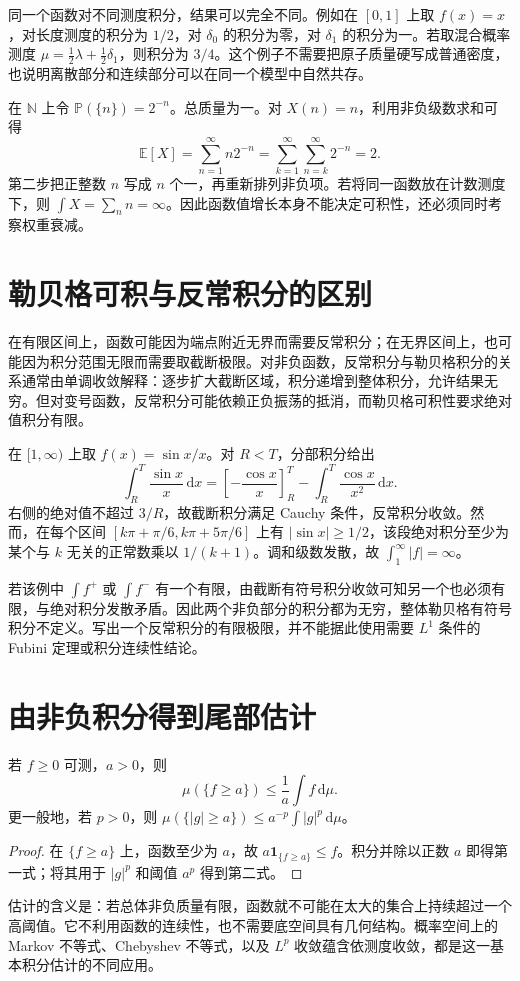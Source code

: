 \documentclass[UTF8,12pt,a4paper,fontset=fandol]{ctexbook}
\begin{document}
同一个函数对不同测度积分，结果可以完全不同。例如在 $[0,1]$ 上取 $f(x)=x$，对长度测度的积分为 $1/2$，对 $\delta_0$ 的积分为零，对 $\delta_1$ 的积分为一。若取混合概率测度 $\mu=\tfrac12\lambda+\tfrac12\delta_1$，则积分为 $3/4$。这个例子不需要把原子质量硬写成普通密度，也说明离散部分和连续部分可以在同一个模型中自然共存。

\begin{example}[具有不同权重的可数模型]
在 $\mathbb N$ 上令 $\mathbb P(\{n\})=2^{-n}$。总质量为一。对 $X(n)=n$，利用非负级数求和可得
\[
 \mathbb E[X]=\sum_{n=1}^{\infty}n2^{-n}
 =\sum_{k=1}^{\infty}\sum_{n=k}^{\infty}2^{-n}=2.
\]
第二步把正整数 $n$ 写成 $n$ 个一，再重新排列非负项。若将同一函数放在计数测度下，则 $\int X=\sum_nn=\infty$。因此函数值增长本身不能决定可积性，还必须同时考察权重衰减。
\end{example}

\section{勒贝格可积与反常积分的区别}
在有限区间上，函数可能因为端点附近无界而需要反常积分；在无界区间上，也可能因为积分范围无限而需要取截断极限。对非负函数，反常积分与勒贝格积分的关系通常由单调收敛解释：逐步扩大截断区域，积分递增到整体积分，允许结果无穷。但对变号函数，反常积分可能依赖正负振荡的抵消，而勒贝格可积性要求绝对值积分有限。

\begin{example}[条件收敛的反常积分不等于勒贝格可积]
在 $[1,\infty)$ 上取 $f(x)=\sin x/x$。对 $R<T$，分部积分给出
\[
 \int_R^T\frac{\sin x}{x}\,\mathrm dx
 =\left[-\frac{\cos x}{x}\right]_R^T-\int_R^T\frac{\cos x}{x^2}\,\mathrm dx.
\]
右侧的绝对值不超过 $3/R$，故截断积分满足 Cauchy 条件，反常积分收敛。然而，在每个区间
$[k\pi+\pi/6,k\pi+5\pi/6]$ 上有 $|\sin x|\geq1/2$，该段绝对积分至少为某个与 $k$ 无关的正常数乘以 $1/(k+1)$。调和级数发散，故 $\int_1^\infty|f|=\infty$。
\end{example}

若该例中 $\int f^+$ 或 $\int f^-$ 有一个有限，由截断有符号积分收敛可知另一个也必须有限，与绝对积分发散矛盾。因此两个非负部分的积分都为无穷，整体勒贝格有符号积分不定义。写出一个反常积分的有限极限，并不能据此使用需要 $L^1$ 条件的 Fubini 定理或积分连续性结论。

\section{由非负积分得到尾部估计}
\begin{proposition}
若 $f\geq0$ 可测，$a>0$，则
\[
 \mu(\{f\geq a\})\leq\frac1a\int f\,\mathrm d\mu.
\]
更一般地，若 $p>0$，则
$\mu(\{|g|\geq a\})\leq a^{-p}\int|g|^p\,\mathrm d\mu$。
\label{prop:mt-markov}
\end{proposition}
\begin{proof}
在 $\{f\geq a\}$ 上，函数至少为 $a$，故 $a\mathbf1_{\{f\geq a\}}\leq f$。积分并除以正数 $a$ 即得第一式；将其用于 $|g|^p$ 和阈值 $a^p$ 得到第二式。
\end{proof}
估计的含义是：若总体非负质量有限，函数就不可能在太大的集合上持续超过一个高阈值。它不利用函数的连续性，也不需要底空间具有几何结构。概率空间上的 Markov 不等式、Chebyshev 不等式，以及 $L^p$ 收敛蕴含依测度收敛，都是这一基本积分估计的不同应用。
\end{document}
